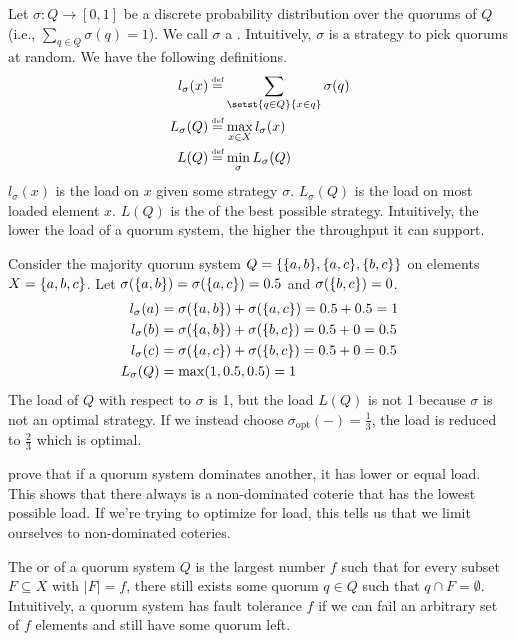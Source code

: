 Let $\sigma: Q \to [0, 1]$ be a discrete probability distribution over the
quorums of $Q$ (i.e., $\sum_{q \in Q} \sigma(q) = 1$). We call $\sigma$ a
. Intuitively, $\sigma$ is a strategy to pick quorums at
random. We have the following definitions.
\begin{align*}
  l_\sigma(x) &\defeq \sum_{\setst{q \in Q}{x \in q}} \sigma(q) \\
  L_\sigma(Q) &\defeq \max_{x \in X} l_\sigma(x) \\
  L(Q)        &\defeq \min_\sigma L_\sigma(Q)
\end{align*}
$l_\sigma(x)$ is the load on $x$ given some strategy $\sigma$. $L_\sigma(Q)$ is
the load on most loaded element $x$. $L(Q)$ is the  of the best
possible strategy. Intuitively, the lower the load of a quorum system, the
higher the throughput it can support.

\begin{example}
  Consider the majority quorum system $Q = \{\{a, b\}, \{a, c\}, \{b,
  c\}\}$ on elements $X = \{a, b, c\}$. Let $\sigma(\{a, b\}) =
  \sigma(\{a, c\}) = 0.5$ and $\sigma(\{b, c\}) = 0$.
  \begin{align*}
    l_\sigma(a) &= \sigma(\{a, b\}) + \sigma(\{a, c\}) = 0.5 + 0.5 = 1 \\
    l_\sigma(b) &= \sigma(\{a, b\}) + \sigma(\{b, c\}) = 0.5 + 0 = 0.5 \\
    l_\sigma(c) &= \sigma(\{a, c\}) + \sigma(\{b, c\}) = 0.5 + 0 = 0.5 \\
    L_\sigma(Q) &= \max(1, 0.5, 0.5) = 1
  \end{align*}
  The load of $Q$ with respect to $\sigma$ is 1, but the load $L(Q)$ is not 1
  because $\sigma$ is not an optimal strategy. If we instead choose
  $\sigma_{\text{opt}}(-) = \frac{1}{3}$, the load is reduced to $\frac{2}{3}$
  which is optimal.
\end{example}

\cite{naor1998load} prove that if a quorum system dominates another, it has
lower or equal load. This shows that there always is a non-dominated coterie
that has the lowest possible load. If we're trying to optimize for load, this
tells us that we limit ourselves to non-dominated coteries.

The  or  of a quorum system $Q$ is
the largest number $f$ such that for every subset $F \subseteq X$ with $|F| =
f$, there still exists some quorum $q \in Q$ such that $q \cap F = \emptyset$.
Intuitively, a quorum system has fault tolerance $f$ if we can fail an
arbitrary set of $f$ elements and still have some quorum left.

